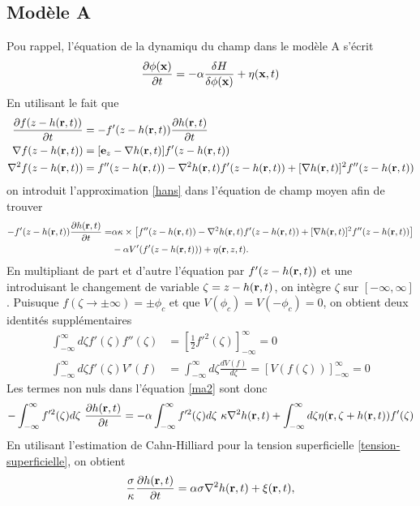     \subsection{Modèle A}
Pou rappel, l'équation de la dynamiqu du champ dans le modèle A s'écrit
\begin{align}
    \frac{\partial \phi({\bf x})}{\partial t}= -\alpha \frac{\delta H}{\delta \phi({\bf x})} + \eta({\bf x},t)
    \label{ma2}
\end{align}
En utilisant le fait que 
\begin{align*}
\frac{\partial f(z-h({\bf r},t))}{\partial t}&= -f'(z-h({\bf r},t))\frac{\partial h({\bf r},t)}{\partial t} \nonumber \\
\nabla f(z-h({\bf r},t))&= [{\bf e}_z-\nabla h({\bf r},t)]f'(z-h({\bf r},t))  \nonumber \\
\nabla^2 f(z-h({\bf r},t))&= f''(z-h({\bf r},t))- \nabla^2 h({\bf r},t)f'(z-h({\bf r},t))+ [\nabla h({\bf r},t)]^2 
f''(z-h({\bf r},t))
\end{align*}
on introduit l'approximation \ref{hans} dans l'équation de champ moyen afin de trouver
\begin{align}
    -f'(z-h({\bf r},t)) \frac{\partial h({\bf r},t)}{\partial t} =& 
    \alpha\kappa\times \left[f''(z-h({\bf r},t))- \nabla^2 h({\bf r},t)f'(z-h({\bf r},t))+ [\nabla h({\bf r},t)]^2 f''(z-h({\bf r},t))\right] \nonumber \\
    &- \alpha V'(f'(z-h({\bf r},t))) + \eta({\bf r},z,t).
\end{align}
En multipliant de part et d'autre l'équation par $f'(z-h({\bf r},t))$ et une introduisant le changement de variable $\zeta=z-h({\bf r},t)$, on intègre $\zeta$ sur $[-\infty,\infty]$. 
Puisuque $f(\zeta \to \pm \infty)=\pm \phi_c$ et que $V(\phi_c)=V(-\phi_c)=0$, on obtient deux identités supplémentaires
\begin{align}
    \int_{-\infty}^\infty d\zeta f'(\zeta)f''(\zeta) &= [\frac{1}{2}f'^2(\zeta)]_{-\infty}^\infty =0\\
    \int_{-\infty}^\infty d\zeta f'(\zeta) V'(f) &= \int_{-\infty}^\infty d\zeta\frac{d V(f)}{d\zeta}= [V(f(\zeta))]_{-\infty}^\infty=0
\end{align} 
Les termes non nuls dans l'équation \ref{ma2} sont donc
\begin{align}
    -\int_{-\infty}^\infty f'^2(\zeta)d\zeta\ \frac{\partial h({\bf r},t)}{\partial t}
    = -\alpha\int_{-\infty}^\infty f'^2(\zeta)d\zeta \ \kappa \nabla^2 h({\bf r},t) + \int_{-\infty}^\infty d\zeta \eta({\bf r},\zeta+ h({\bf r},t))f'(\zeta)
\end{align}
En utilisant l'estimation de Cahn-Hilliard pour la tension superficielle \ref{tension-superficielle}, on obtient 
\begin{align}
    \frac{\sigma}{\kappa} \frac{\partial h({\bf r},t)}{\partial t} = \alpha\sigma \nabla^2 h({\bf r},t) +\xi({\bf r},t),
\end{align}
